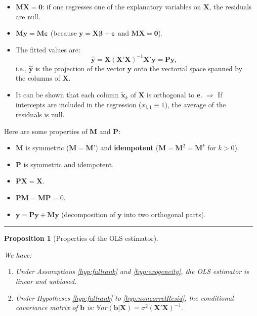 \documentclass[
]{book}
\providecommand{\tightlist}{%
  \setlength{\itemsep}{0pt}\setlength{\parskip}{0pt}}
\newtheorem{proposition}{Proposition}[chapter]
\theoremstyle{definition}
\theoremstyle{definition}
\theoremstyle{definition}
\theoremstyle{definition}
\theoremstyle{remark}
\begin{document}
\begin{itemize}
\tightlist
\item
  \(\mathbf{M} \mathbf{X} = \mathbf{0}\): if one regresses one of the explanatory variables on \(\mathbf{X}\), the residuals are null.
\item
  \(\mathbf{M}\mathbf{y}=\mathbf{M}\boldsymbol\varepsilon\) (because \(\mathbf{y} = \mathbf{X}\boldsymbol\beta + \boldsymbol\varepsilon\) and \(\mathbf{M} \mathbf{X} = \mathbf{0}\)).
\item
  The fitted values are:
  \begin{equation}
  \hat{\mathbf{y}}=\mathbf{X} (\mathbf{X}'\mathbf{X})^{-1} \mathbf{X}' \mathbf{y} = \mathbf{P} \mathbf{y},\label{eq:Proj}
  \end{equation}
  i.e., \(\hat{\mathbf{y}}\) is the projection of the vector \(\mathbf{y}\) onto the vectorial space spanned by the columns of \(\mathbf{X}\).
\item
  It can be shown that each column \(\tilde{\mathbf{x}}_k\) of \(\mathbf{X}\) is orthogonal to \(\mathbf{e}\). \(\Rightarrow\) If intercepts are included in the regression (\(x_{i,1} \equiv 1\)), the average of the residuals is null.
\end{itemize}

Here are some properties of \(\mathbf{M}\) and \(\mathbf{P}\):

\begin{itemize}
\tightlist
\item
  \(\mathbf{M}\) is symmetric (\(\mathbf{M} = \mathbf{M}'\)) and \textbf{idempotent} (\(\mathbf{M} = \mathbf{M}^2 = \mathbf{M}^k\) for \(k>0\)).
\item
  \(\mathbf{P}\) is symmetric and idempotent.
\item
  \(\mathbf{P}\mathbf{X} = \mathbf{X}\).
\item
  \(\mathbf{P} \mathbf{M} = \mathbf{M} \mathbf{P} = 0\).
\item
  \(\mathbf{y} = \mathbf{P}\mathbf{y} + \mathbf{M}\mathbf{y}\) (decomposition of \(\mathbf{y}\) into two orthogonal parts).
\end{itemize}

\begin{center}\rule{0.5\linewidth}{0.5pt}\end{center}

\begin{proposition}[Properties of the OLS estimator]
\protect\hypertarget{prp:propOLS}{}\label{prp:propOLS}

We have:

\begin{enumerate}
\def\labelenumi{\roman{enumi}.}
\item
  Under Assumptions \ref{hyp:fullrank} and \ref{hyp:exogeneity}, the OLS estimator is linear and unbiased.
\item
  Under Hypotheses \ref{hyp:fullrank} to \ref{hyp:noncorrelResid}, the conditional covariance matrix of \(\mathbf{b}\) is: \(\mathbb{V}ar(\mathbf{b}|\mathbf{X}) = \sigma^2 (\mathbf{X}'\mathbf{X})^{-1}\).
\end{enumerate}

\end{proposition}
\end{document}
